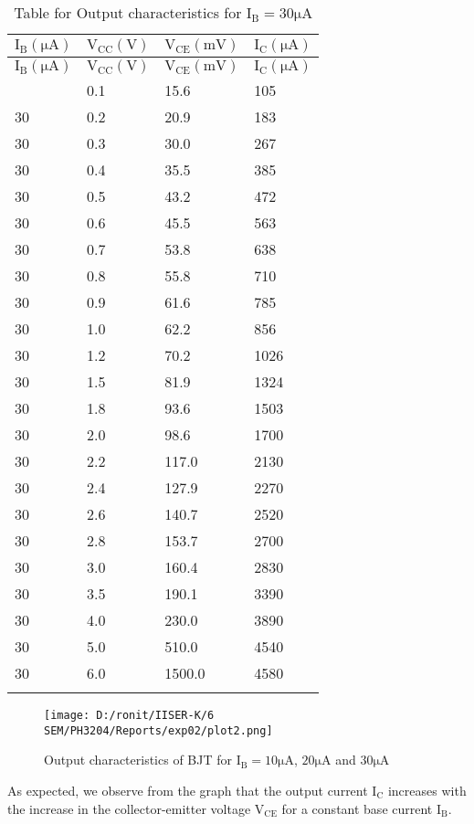 \documentclass[12pt]{article}
\begin{document}
\begin{longtable}{|l|l|l|l|}
	\hline
    $\mathrm{I_{B}(\mu A)}$ & $\mathrm{V_{CC}(V)}$  & $\mathrm{V_{CE}(mV)}$&  $\mathrm{I_{C}(\mu A)}$ \\ \hline
	\endfirsthead
	\hline
    $\mathrm{I_{B}(\mu A)}$ & $\mathrm{V_{CC}(V)}$& $\mathrm{V_{CE}(mV)}$&  $\mathrm{I_{C}(\mu A)}$ \\ \hline
	\endhead
	\hline
	\endfoot
	\endlastfoot
    30  & 0.1  & 15.6  & 105  \\ \hline
    30  & 0.2  & 20.9  & 183  \\ \hline
    30  & 0.3  & 30.0  & 267  \\ \hline
    30  & 0.4  & 35.5  & 385  \\ \hline
    30  & 0.5  & 43.2  & 472  \\ \hline
    30  & 0.6  & 45.5  & 563  \\ \hline
    30  & 0.7  & 53.8  & 638  \\ \hline
    30  & 0.8  & 55.8  & 710  \\ \hline
    30  & 0.9  & 61.6  & 785  \\ \hline
    30  & 1.0  & 62.2  & 856  \\ \hline
    30  & 1.2  & 70.2  & 1026 \\ \hline
    30  & 1.5  & 81.9  & 1324 \\ \hline
    30  & 1.8  & 93.6  & 1503 \\ \hline
    30  & 2.0  & 98.6  & 1700 \\ \hline
    30  & 2.2  & 117.0 & 2130 \\ \hline
    30  & 2.4  & 127.9 & 2270 \\ \hline
    30  & 2.6  & 140.7 & 2520 \\ \hline
    30  & 2.8  & 153.7 & 2700 \\ \hline
    30  & 3.0  & 160.4 & 2830 \\ \hline
    30  & 3.5  & 190.1 & 3390 \\ \hline
    30  & 4.0  & 230.0 & 3890 \\ \hline
    30  & 5.0  & 510.0 & 4540 \\ \hline
    30  & 6.0  & 1500.0 & 4580 \\ \hline
\caption{Table for Output characteristics for $\mathrm{I_B=30 \mu A}$}
\label{tab:part02_03}
\end{longtable}
\begin{figure}[H]  
    \centering  
    \texttt{[image: D:/ronit/IISER-K/6 SEM/PH3204/Reports/exp02/plot2.png]}  %
    \caption{Output characteristics of BJT for $\mathrm{I_{B}=10\mu A}$, $\mathrm{20\mu A}$ and $\mathrm{30\mu A}$}  %
    \label{fig:part01_02}  %
  \end{figure}\noindent
As expected, we observe from the graph that the output current $\mathrm{I_C}$ increases with the increase in the collector-emitter voltage $\mathrm{V_{CE}}$ for a constant base current $\mathrm{I_B}$.
\end{document}
